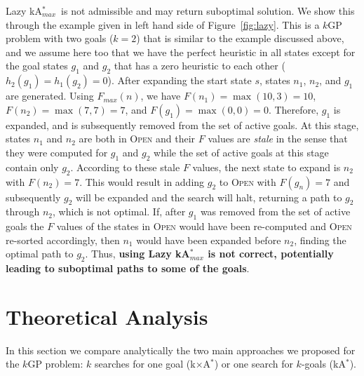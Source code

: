 \documentclass{aicom2e}
\newcommand{\kgs}{$k$GP}
\newcommand{\kastar}{kA$^*$}
\newcommand{\kastarmax}{kA$^*_{max}$}
\newcommand{\kxastar}{k$\times$A$^*$}
\newcommand{\maxf}{$F_{max}(n)$}
\newcommand{\open}{\textsc{Open}}
\begin{document}
Lazy \kastarmax\ is not admissible and may return suboptimal solution. We show
this through the example given in left hand side of Figure~\ref{fig:lazy}. This
is a \kgs{} problem with two goals ($k=2$) that is similar to the example
discussed above, and we assume here too that we have the perfect heuristic in
all states except for the goal states $g_1$ and $g_2$ that has a zero heuristic
to each other ($h_2(g_1)=h_1(g_2)=0$). After expanding the start state $s$,
states $n_1$, $n_2$, and $g_1$ are generated. Using \maxf{}, we have
$F(n_1)=\max(10,3)=10$, $F(n_2)=\max(7,7)=7$, and $F(g_1)=\max(0,0)=0$.
Therefore, $g_1$ is expanded, and is subsequently removed from the set of
active goals. At this stage, states $n_1$ and $n_2$ are both in \open{} and
their $F$ values are {\em stale} in the sense that they were computed for $g_1$
and $g_2$ while the set of active goals at this stage contain only $g_2$.
According to these stale $F$ values, the next state to expand is $n_2$ with
$F(n_2)=7$. This would result in adding $g_2$ to \open{} with $F(g_n)=7$ and
subsequently $g_2$ will be expanded and the search will halt, returning a
path to $g_2$ through $n_2$, which is not optimal. If, after $g_1$
was removed from the set of active goals the $F$ values of the states in
\open{} would have been re-computed and \open{} re-sorted accordingly, then
$n_1$ would have been expanded before $n_2$, finding the optimal path to $g_2$.
Thus, {\bf using Lazy \kastarmax{} is not correct, potentially leading to
suboptimal paths to some of the goals}.


\section{Theoretical Analysis}
\label{sec:theoretical-analysis}

In this section we compare analytically the two main approaches we proposed for
the \kgs{} problem: $k$ searches for one goal (\kxastar{}) or one search for
$k$-goals (\kastar{}).
\end{document}
